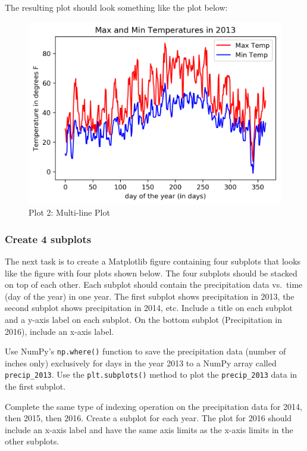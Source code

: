 \documentclass[11pt]{article}
\makeatletter
\def\maxwidth{\ifdim\Gin@nat@width>\linewidth\linewidth
    \else\Gin@nat@width\fi}
\let\Oldincludegraphics\includegraphics
\renewcommand{\includegraphics}[1]{\Oldincludegraphics[width=.8\maxwidth]{#1}}
\makeatother
\begin{document}
The resulting plot should look something like the plot below:

\begin{figure}[h!]
\centering
\includegraphics{images/plot2.png}
\caption{Plot 2: Multi-line Plot}
\end{figure}

    \hypertarget{create-4-subplots}{%
\subsubsection{Create 4 subplots}\label{create-4-subplots}}

The next task is to create a Matplotlib figure containing four subplots
that looks like the figure with four plots shown below. The four
subplots should be stacked on top of each other. Each subplot should
contain the precipitation data vs.~time (day of the year) in one year.
The first subplot shows precipitation in 2013, the second subplot shows
precipitation in 2014, etc. Include a title on each subplot and a y-axis
label on each subplot. On the bottom subplot (Precipitation in 2016),
include an x-axis label.

Use NumPy's \texttt{np.where()} function to save the precipitation data
(number of inches only) exclusively for days in the year 2013 to a NumPy
array called \texttt{precip\_2013}. Use the \texttt{plt.subplots()}
method to plot the \texttt{precip\_2013} data in the first subplot.

Complete the same type of indexing operation on the precipitation data
for 2014, then 2015, then 2016. Create a subplot for each year. The plot
for 2016 should include an x-axis label and have the same axis limits as
the x-axis limits in the other subplots.
\end{document}

